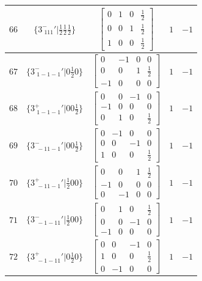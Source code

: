\documentclass[fleqn,8pt]{jsarticle}
\begin{document}
\begin{longtable}{ccccc}
$ 66 $ & $ \{3^{-}_{\,\,111}{}'|\frac{1}{2} \frac{1}{2} \frac{1}{2}\} $ & $ \begin{bmatrix} 0 & 1 & 0 & \frac{1}{2} \\ 0 & 0 & 1 & \frac{1}{2} \\ 1 & 0 & 0 & \frac{1}{2} \end{bmatrix} $ & $ 1 $ & $ -1 $ \\ \hline
$ 67 $ & $ \{3^{-}_{\,\,1-1-1}{}'|0 \frac{1}{2} 0\} $ & $ \begin{bmatrix} 0 & -1 & 0 & 0 \\ 0 & 0 & 1 & \frac{1}{2} \\ -1 & 0 & 0 & 0 \end{bmatrix} $ & $ 1 $ & $ -1 $ \\ \hline
$ 68 $ & $ \{3^{+}_{\,\,1-1-1}{}'|0 0 \frac{1}{2}\} $ & $ \begin{bmatrix} 0 & 0 & -1 & 0 \\ -1 & 0 & 0 & 0 \\ 0 & 1 & 0 & \frac{1}{2} \end{bmatrix} $ & $ 1 $ & $ -1 $ \\ \hline
$ 69 $ & $ \{3^{-}_{\,\,-11-1}{}'|0 0 \frac{1}{2}\} $ & $ \begin{bmatrix} 0 & -1 & 0 & 0 \\ 0 & 0 & -1 & 0 \\ 1 & 0 & 0 & \frac{1}{2} \end{bmatrix} $ & $ 1 $ & $ -1 $ \\ \hline
$ 70 $ & $ \{3^{+}_{\,\,-11-1}{}'|\frac{1}{2} 0 0\} $ & $ \begin{bmatrix} 0 & 0 & 1 & \frac{1}{2} \\ -1 & 0 & 0 & 0 \\ 0 & -1 & 0 & 0 \end{bmatrix} $ & $ 1 $ & $ -1 $ \\ \hline
$ 71 $ & $ \{3^{-}_{\,\,-1-11}{}'|\frac{1}{2} 0 0\} $ & $ \begin{bmatrix} 0 & 1 & 0 & \frac{1}{2} \\ 0 & 0 & -1 & 0 \\ -1 & 0 & 0 & 0 \end{bmatrix} $ & $ 1 $ & $ -1 $ \\ \hline
$ 72 $ & $ \{3^{+}_{\,\,-1-11}{}'|0 \frac{1}{2} 0\} $ & $ \begin{bmatrix} 0 & 0 & -1 & 0 \\ 1 & 0 & 0 & \frac{1}{2} \\ 0 & -1 & 0 & 0 \end{bmatrix} $ & $ 1 $ & $ -1 $ \\ \hline

\end{longtable}
\end{document}
